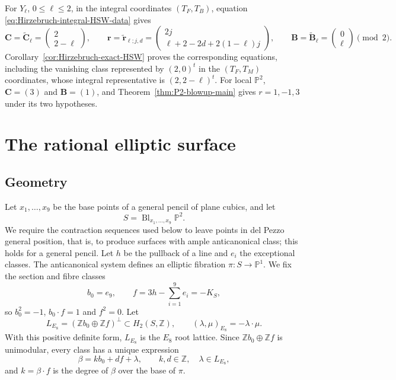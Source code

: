 \documentclass{amsart}
\theoremstyle{definition}
\numberwithin{equation}{section}
\newcommand{\Z}{\mathbb Z}
\begin{document}
For \(Y_\ell\), \(0\leq\ell\leq2\), in the integral coordinates \((T_F,T_B)\), equation \eqref{eq:Hirzebruch-integral-HSW-data} gives
\[
 \mathbf C=\widetilde{\mathbf C}_\ell
 =\begin{pmatrix}2\\2-\ell\end{pmatrix},\qquad
 \mathbf r=\widetilde{\mathbf r}_{\ell;j,d}=
 \begin{pmatrix}2j\\\ell+2-2d+2(1-\ell)j\end{pmatrix},
 \qquad \mathbf B=\widetilde{\mathbf B}_\ell
 =\begin{pmatrix}0\\\ell\end{pmatrix}\pmod2.
\]
Corollary~\ref{cor:Hirzebruch-exact-HSW} proves the corresponding equations, including the vanishing class represented by \((2,0)^t\) in the \((T_F,T_M)\) coordinates, whose integral representative is \((2,2-\ell)^t\).  For local \(\mathbb P^2\), \(\mathbf C=(3)\) and \(\mathbf B=(1)\), and Theorem~\ref{thm:P2-blowup-main} gives \(r=1,-1,3\) under its two hypotheses.

\section{The rational elliptic surface}
\label{sec:rational-elliptic-conjecture}

\subsection{Geometry}
Let \(x_1,\ldots,x_9\) be the base points of a general pencil of plane cubics, and let
\[
 S=\operatorname{Bl}_{x_1,\ldots,x_9}\mathbb P^2.
\]
We require the contraction sequences used below to leave points in del Pezzo general position, that is, to produce surfaces with ample anticanonical class; this holds for a general pencil.  Let \(h\) be the pullback of a line and \(e_i\) the exceptional classes.  The anticanonical system defines an elliptic fibration \(\pi:S\to\mathbb P^1\).  We fix the section and fibre classes
\begin{equation}
 b_0=e_9,
 \qquad
 f=3h-\sum_{i=1}^9e_i=-K_S,
\label{eq:rational-elliptic-section-fibre}
\end{equation}
so \(b_0^2=-1\), \(b_0\cdot f=1\) and \(f^2=0\).  Let
\begin{equation}
 L_{E_8}=(\Z b_0\oplus\Z f)^\perp\subset H_2(S,\Z),
 \qquad
 (\lambda,\mu)_{E_8}=-\lambda\cdot\mu.
\label{eq:rational-elliptic-E8-lattice}
\end{equation}
With this positive definite form, \(L_{E_8}\) is the \(E_8\) root lattice.  Since \(\Z b_0\oplus\Z f\) is unimodular, every class has a unique expression
\begin{equation}
 \beta=kb_0+d f+\lambda,
 \qquad k,d\in\Z,
 \quad \lambda\in L_{E_8},
\label{eq:rational-elliptic-class-decomposition}
\end{equation}
and \(k=\beta\cdot f\) is the degree of \(\beta\) over the base of \(\pi\).
\end{document}
